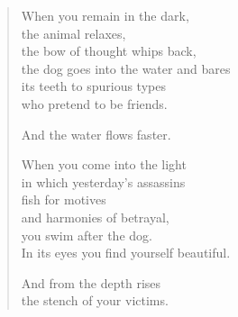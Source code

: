\begin{verse}

When you remain in the dark,\\
the animal relaxes,\\
the bow of thought whips back,\\
the dog goes into the water and bares\\
its teeth to spurious types\\
who pretend to be friends.

And the water flows faster.

When you come into the light\\
in which yesterday's assassins\\
fish for motives\\
and harmonies of betrayal,\\
you swim after the dog.\\
In its eyes you find yourself beautiful.

And from the depth rises\\
the stench of your victims.

\end{verse}
